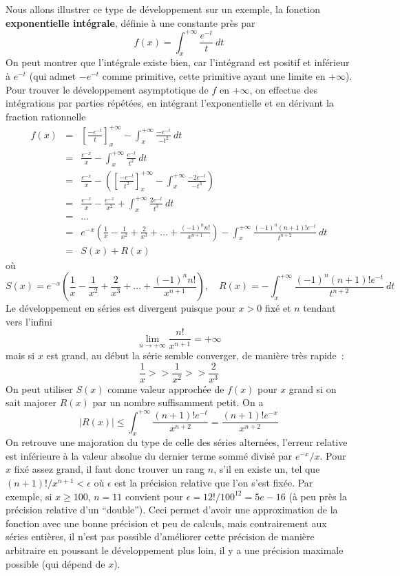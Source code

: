 \documentclass[a4paper,11pt]{article}
\begin{document}
\begin{giacjshere}
Nous allons illustrer ce type de développement sur un exemple, la fonction 
{\bf exponentielle intégrale}, 
définie à une constante près par
\[ f(x)=\int_x^{+\infty} \frac{e^{-t}}{t} \ dt \]
On peut montrer que l'intégrale existe bien, car l'intégrand est positif et inférieur à $e^{-t}$
(qui admet $-e^{-t}$ comme primitive, cette primitive ayant une limite en $+\infty$).
Pour trouver le développement asymptotique de $f$ en $+\infty$, on effectue des intégrations
par parties répétées, en intégrant l'exponentielle et en dérivant la fraction rationnelle
\begin{eqnarray*}
 f(x)&=&[\frac{-e^{-t}}{t}]_x^{+\infty} - \int_x^{+\infty} \frac{-e^{-t}}{-t^2} \ dt \\
&=& \frac{e^{-x}}{x} - \int_x^{+\infty} \frac{e^{-t}}{t^2} \ dt \\
&=& \frac{e^{-x}}{x} - ([\frac{-e^{-t}}{t^2}]_x^{+\infty} - \int_x^{+\infty} \frac{-2e^{-t}}{-t^3}) \\
&=& \frac{e^{-x}}{x} - \frac{e^{-x}}{x^2} + \int_x^{+\infty} \frac{2e^{-t}}{t^3} \ dt \\
&=& ... \\
&=& e^{-x}\left(\frac{1}{x} - \frac{1}{x^2} + \frac{2}{x^3} + ... + \frac{(-1)^n n!}{x^{n+1}}\right)
- \int_x^{+\infty} \frac{(-1)^n (n+1)!e^{-t}}{t^{n+2}} \ dt \\
&=& S(x) + R(x)
\end{eqnarray*}
où
\begin{equation} \label{eq:Eiinf}
 S(x)=e^{-x}
\left(\frac{1}{x} - \frac{1}{x^2} + \frac{2}{x^3} + ... + \frac{(-1)^n n!}{x^{n+1}}\right), 
\quad R(x)=- \int_x^{+\infty} \frac{(-1)^n (n+1)!e^{-t}}{t^{n+2}} \ dt 
\end{equation}
Le développement en séries est divergent puisque pour $x>0$ fixé et $n$ tendant vers l'infini
\[ \lim_{n\rightarrow +\infty} \frac{n!}{x^{n+1}} = +\infty\]
mais si $x$ est grand, au début la série semble converger, de manière très rapide~:
\[ \frac{1}{x} >> \frac{1}{x^2} >> \frac{2}{x^3} \]
On peut utiliser $S(x)$ comme valeur approchée de $f(x)$ pour $x$ grand si on sait majorer
$R(x)$ par un nombre suffisamment petit. On a
\[ | R(x) | \leq \int_x^{+\infty} \frac{(n+1)!e^{-t}}{x^{n+2}}
= \frac{(n+1)!e^{-x}}{x^{n+2}} \]
On retrouve une majoration du type de celle des séries alternées, 
l'erreur relative est inférieure
à la valeur absolue du dernier terme sommé divis\'e par $e^{-x}/x$. 
Pour $x$ fixé assez grand, il 
faut donc trouver un rang $n$, s'il en existe un, 
tel que $(n+1)!/x^{n+1}<\epsilon$ où
$\epsilon$ est la précision relative que l'on s'est fixée.
Par exemple, si $x\geq 100$, $n=11$ convient pour 
$\epsilon=12!/100^{12}=5e-16$ (à peu près
la précision relative d'un ``double'').
Ceci permet d'avoir une approximation de la fonction avec une bonne
pr\'ecision et peu de calculs, mais contrairement aux s\'eries enti\`eres,
il n'est pas possible d'am\'eliorer cette pr\'ecision de mani\`ere
arbitraire en poussant le d\'eveloppement plus loin, il y a une
pr\'ecision maximale possible (qui d\'epend de $x$).


\end{giacjshere}
\end{document}

